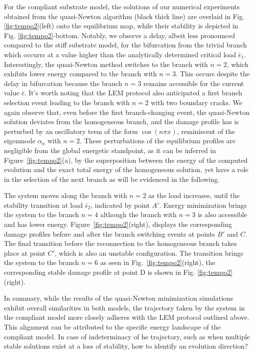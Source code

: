 \documentclass[10pt]{article}
\begin{document}
%
For the compliant substrate model, the solutions of our numerical experiments obtained from the quasi-Newton algorithm (black thick line) are overlaid in Fig. \ref{fig:tempo2}(left) onto the equilibrium map, while their stability is depicted in Fig. \ref{fig:tempo2}-bottom. Notably, we observe a delay, albeit less pronounced compared to the stiff substrate model, for the bifurcation from the trivial branch which occurrs at a value  higher than the analytically determined critical load \(\bar{\epsilon}_1\). Interestingly, the quasi-Newton method switches to the branch with $n=2$, which exhibits lower energy compared to the branch with $n=3$. This occurs  despite the delay in bifurcation because the branch  $n=3$ remains accessible for the current value $\bar\epsilon$. It's worth noting that the LEM protocol also anticipated a first branch selection event leading to the branch with $n=2$ with two boundary cracks. 
We again observe that, even before the first branch-changing event, the quasi-Newton solution {deviates from the homogeneous branch, and the damage profile has} is perturbed by an oscillatory term of the form \(\cos(n\pi x)\), reminiscent of the eigenmode $\alpha_n$  with \(n=2\). 
%
These perturbations of the equilibrium profiles are negligible from the global energetic standpoint, as it can be inferred in Figure~\ref{fig:tempo2}(a), by the superposition between the energy of the computed evolution and the exact total energy of the homogeneous solution, yet have a role in the selection of the next branch as will be evidenced in the following.

The system moves along the branch with $n=2$  as the load increases, until the stability transition at load $\bar \epsilon_2$, indicated by point $A'$. Energy minimization brings the system to the branch $n=4$ although the branch with $n=3$ is also accessible and has lower energy. Figure~\ref{fig:tempo2}(right), displays the corresponding damage profiles before and after {the branch} switching events  at points $B'$ and $C$. The final {transition} before the reconnection to the homogeneous branch takes place at point $C'$, which is also an unstable configuration. The transition brings the system to the branch $n=6$ as seen in Fig.~\ref{fig:tempo2}(right), the corresponding stable damage profile at point D is shown in Fig. \ref{fig:tempo2}(right). 

In summary, while the results of the quasi-Newton minimization simulations exhibit overall similarities in both models, the trajectory taken by the system in the compliant model more closely adheres with the LEM protocol outlined above. This alignment can be attributed to the specific energy landscape of the compliant model. In case of indeterminacy of he trajectory, such as when multiple stable solutions exist at a loss of stability, how to identify an evolution direction?
\end{document}
